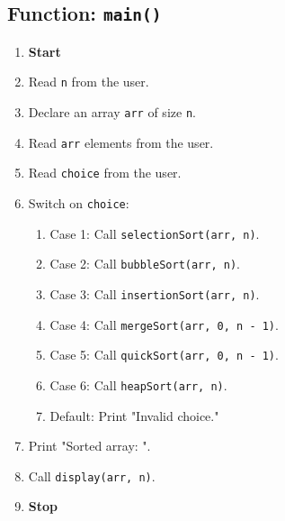 {  \subsection{Function: \texttt{main()}}
  \begin{enumerate}[label*=\arabic*.]
    \item \textbf{Start}
    \item Read \texttt{n} from the user.
    \item Declare an array \texttt{arr} of size \texttt{n}.
    \item Read \texttt{arr} elements from the user.
    \item Read \texttt{choice} from the user.
    \item Switch on \texttt{choice}:
          \begin{enumerate}[label*=\arabic*.]
            \item Case 1: Call \texttt{selectionSort(arr, n)}.
            \item Case 2: Call \texttt{bubbleSort(arr, n)}.
            \item Case 3: Call \texttt{insertionSort(arr, n)}.
            \item Case 4: Call \texttt{mergeSort(arr, 0, n - 1)}.
            \item Case 5: Call \texttt{quickSort(arr, 0, n - 1)}.
            \item Case 6: Call \texttt{heapSort(arr, n)}.
            \item Default: Print "Invalid choice."
          \end{enumerate}
    \item Print "Sorted array: ".
    \item Call \texttt{display(arr, n)}.
    \item \textbf{Stop}
  \end{enumerate}
 }

